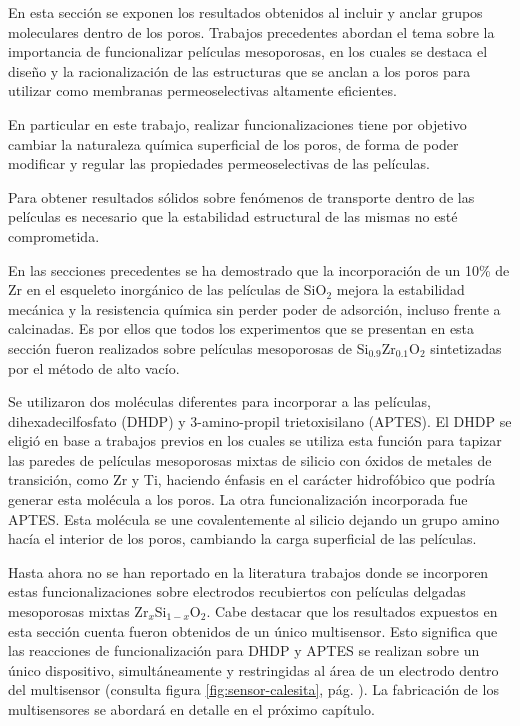 			En esta sección se exponen los resultados obtenidos al incluir y anclar grupos moleculares dentro de los poros. Trabajos precedentes abordan el tema sobre la importancia de funcionalizar películas mesoporosas, en los cuales se destaca el diseño y la racionalización de las estructuras que se anclan a los poros para utilizar como membranas permeoselectivas altamente eficientes.\cite{Otal2006,Calvo2008,alberti2015,Calvo20210,Dunphy2004} 

			En particular en este trabajo, realizar funcionalizaciones tiene por objetivo cambiar la naturaleza química superficial de los poros, de forma de poder modificar y regular las propiedades permeoselectivas de las películas. 

			Para obtener resultados sólidos sobre fenómenos de transporte dentro de las películas es necesario que la estabilidad estructural de las mismas no esté comprometida. 

			En las secciones precedentes se ha demostrado que la incorporación de un 10\% de Zr en el esqueleto inorgánico de las películas de SiO$_2$ mejora la estabilidad mecánica y la resistencia química sin perder poder de adsorción, incluso frente a \pdmF\space calcinadas. Es por ellos que todos los experimentos que se presentan en esta sección fueron realizados sobre películas mesoporosas de  Si$_{0.9}$Zr$_{0.1}$O$_2$ sintetizadas por el método de alto vacío.

			Se utilizaron dos moléculas diferentes para incorporar a las películas, dihexadecilfosfato (DHDP) y 3-amino-propil trietoxisilano (APTES). El DHDP se eligió en base a trabajos previos en los cuales se utiliza esta función para tapizar las paredes de películas mesoporosas mixtas de silicio con óxidos de metales de transición, como Zr y Ti, haciendo énfasis en el carácter hidrofóbico que podría generar esta molécula a los poros.\cite{Angelome2008,Otal2006} La otra funcionalización incorporada fue APTES. Esta molécula se une covalentemente al silicio dejando un grupo amino hacía el interior de los poros, cambiando la carga superficial de las películas. \cite{Calvo2009b,Fattakhova-Rohlfing2007,Andrieu-brunsen2014,Andrieu-Brunsen2015}

		 	Hasta ahora no se han reportado en la literatura trabajos donde se incorporen estas funcionalizaciones sobre electrodos recubiertos con películas delgadas mesoporosas mixtas Zr$_x$Si$_{1-x}$O$_2$. Cabe destacar que los resultados expuestos en esta sección cuenta fueron obtenidos de un único multisensor. Esto significa que las reacciones de funcionalización para DHDP y APTES se realizan sobre un único dispositivo, simultáneamente y restringidas al área de un electrodo dentro del multisensor (consulta figura \ref{fig:sensor-calesita}, pág. \pageref{fig:sensor-calesita}).	La fabricación de los multisensores se abordará en detalle en el próximo capítulo.
	

